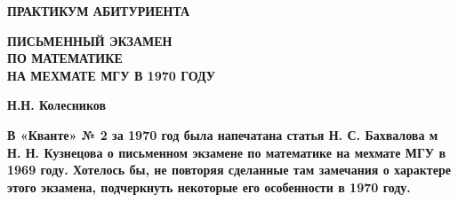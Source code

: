 \newpage
{}
\setcounter{page}{45}


\hline
\begin{center}
    \textbf{ПРАКТИКУМ АБИТУРИЕНТА}
\end{center}
\hline
\begin{LARGE}\begin{flushleft}
    \textbf{ПИСЬМЕННЫЙ ЭКЗАМЕН\\
    ПО МАТЕМАТИКЕ\\
    НА МЕХМАТЕ МГУ В 1970 ГОДУ}
\end{flushleft}\end{LARGE}

\begin{flushright}
\textbf{Н.Н. Колесников}
\end{flushright}

\large
\begin{changemargin}{0.7 cm}{0.5 cm} 
\begin{justify}
\textbf{В «Кванте» № 2 за 1970 год была напечатана статья Н. С. Бахвалова м Н. Н. Кузнецова о письменном экзамене по математике на мехмате МГУ в 1969 году. Хотелось бы, не повторяя сделанные там замечания о характере этого экзамена, подчеркнуть некоторые его особенности
в 1970 году.}
\end{justify}
\end{changemargin}

